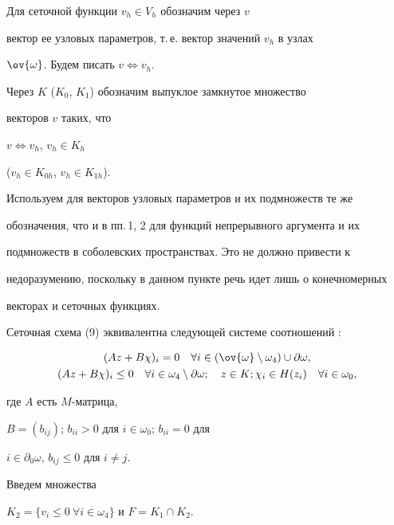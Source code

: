 Для сеточной функции $v_{h} \in V_{h}$ обозначим через $v$


вектор ее узловых параметров, т.\,е. вектор значений $v_{h}$ в узлах


$\ov{\omega}$. Будем писать $v \Leftrightarrow v_{h}$.


Через $K$ ($K_{0}$, $K_{1}$) обозначим выпуклое замкнутое множество


векторов $v$ таких, что


$v \Leftrightarrow v_{h}$, $v_{h} \in K_{h}$


($v_h \in K_{0h}$, $v_{h} \in K_{1h}$).


Используем для векторов узловых параметров и их подмножеств те же


обозначения, что и в пп.\,1, 2 для функций непрерывного аргумента и их


подмножеств в соболевских пространствах. Это не должно привести к


недоразумению, поскольку в данном пункте речь идет лишь о конечномерных


векторах и сеточных функциях.





Сеточная схема (9) эквивалентна следующей системе соотношений :


\begin{gather}


(Az+B\chi)_i=0 \quad \forall i \in (\ov{\omega} \setminus


\omega_4) \cup \partial \omega,\notag \\


%


\label{10}


(Az+B\chi)_i \leq 0


\quad \forall i \in \omega_4 \setminus \partial \omega; \quad z \in K;


\chi_i \in H(z_i) \quad \forall i \in \omega_0,


\end{gather}


где $A$ есть $M$-матрица,


$B=(b_{ij})$; $b_{ii} > 0$ для $i \in \omega_0$; $b_{ii} =0$ для


$i \in \partial_0 \omega$, $b_{ij} \leq 0$ для $i \neq j$.





Введем множества


$K_2 = \{v_{i} \leq 0 \ \forall i \in \omega_4\}$ и $F=K_1\cap K_2$.


